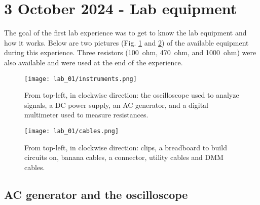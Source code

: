 \section{3 October 2024 - Lab equipment}

The goal of the first lab experience was to get to know the lab equipment and how it works. Below are two pictures (Fig. \ref{fig:01_instruments} and \ref{fig:01_cables}) of the available equipment during this experience. Three resistors (\SI{100}{ohm}, \SI{470}{ohm}, and \SI{1000}{ohm}) were also available and were used at the end of the experience.
\begin{figure}[htbp]
	\centering
	\texttt{[image: lab\_01/instruments.png]}
	\caption{From top-left, in clockwise direction: the oscilloscope used to analyze signals, a DC power supply, an AC generator, and a digital multimeter used to measure resistances.}
	\label{fig:01_instruments}
\end{figure}
\begin{figure}[htbp]
	\centering
	\texttt{[image: lab\_01/cables.png]}
	\caption{From top-left, in clockwise direction: clips, a breadboard to build circuits on, banana cables, a connector, utility cables and DMM cables.}
	\label{fig:01_cables}
\end{figure}

\subsection{AC generator and the oscilloscope}